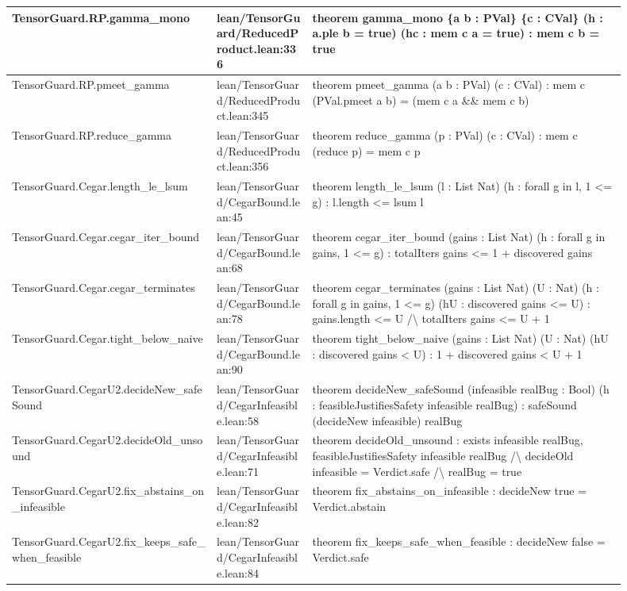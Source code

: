 \documentclass[10pt]{article}
\begin{document}
\begin{longtable}{|p{0.30\linewidth}|p{0.14\linewidth}|p{0.46\linewidth}|}
TensorGuard.RP.gamma\_mono & lean/TensorGuard/ReducedProduct.lean:336 & theorem gamma\_mono \{a b : PVal\} \{c : CVal\} (h : a.ple b = true) (hc : mem c a = true) : mem c b = true \\
\hline
TensorGuard.RP.pmeet\_gamma & lean/TensorGuard/ReducedProduct.lean:345 & theorem pmeet\_gamma (a b : PVal) (c : CVal) : mem c (PVal.pmeet a b) = (mem c a \&\& mem c b) \\
\hline
TensorGuard.RP.reduce\_gamma & lean/TensorGuard/ReducedProduct.lean:356 & theorem reduce\_gamma (p : PVal) (c : CVal) : mem c (reduce p) = mem c p \\
\hline
TensorGuard.Cegar.length\_le\_lsum & lean/TensorGuard/CegarBound.lean:45 & theorem length\_le\_lsum (l : List Nat) (h : forall g in l, 1 <= g) : l.length <= lsum l \\
\hline
TensorGuard.Cegar.cegar\_iter\_bound & lean/TensorGuard/CegarBound.lean:68 & theorem cegar\_iter\_bound (gains : List Nat) (h : forall g in gains, 1 <= g) : totalIters gains <= 1 + discovered gains \\
\hline
TensorGuard.Cegar.cegar\_terminates & lean/TensorGuard/CegarBound.lean:78 & theorem cegar\_terminates (gains : List Nat) (U : Nat) (h : forall g in gains, 1 <= g) (hU : discovered gains <= U) : gains.length <= U /\textbackslash{} totalIters gains <= U + 1 \\
\hline
TensorGuard.Cegar.tight\_below\_naive & lean/TensorGuard/CegarBound.lean:90 & theorem tight\_below\_naive (gains : List Nat) (U : Nat) (hU : discovered gains < U) : 1 + discovered gains < U + 1 \\
\hline
TensorGuard.CegarU2.decideNew\_safeSound & lean/TensorGuard/CegarInfeasible.lean:58 & theorem decideNew\_safeSound (infeasible realBug : Bool) (h : feasibleJustifiesSafety infeasible realBug) : safeSound (decideNew infeasible) realBug \\
\hline
TensorGuard.CegarU2.decideOld\_unsound & lean/TensorGuard/CegarInfeasible.lean:71 & theorem decideOld\_unsound : exists infeasible realBug, feasibleJustifiesSafety infeasible realBug /\textbackslash{} decideOld infeasible = Verdict.safe /\textbackslash{} realBug = true \\
\hline
TensorGuard.CegarU2.fix\_abstains\_on\_infeasible & lean/TensorGuard/CegarInfeasible.lean:82 & theorem fix\_abstains\_on\_infeasible : decideNew true = Verdict.abstain \\
\hline
TensorGuard.CegarU2.fix\_keeps\_safe\_when\_feasible & lean/TensorGuard/CegarInfeasible.lean:84 & theorem fix\_keeps\_safe\_when\_feasible : decideNew false = Verdict.safe \\

\end{longtable}
\end{document}
